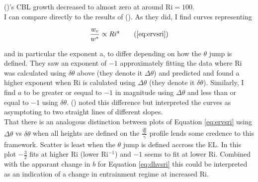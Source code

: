 \citeauthor{BrooksFowler2} (\citeyear{BrooksFowler2})'s \acs{CBL} growth decreased to almost zero at around \acs{Ri}$=100$.\\

I can compare directly to the results of \citeauthor{FedConzMir04} (\citeyear{FedConzMir04}). As they did, I find curves representing

\begin{equation}
\frac{w_{e}}{w^{*}} \propto Ri^{a} \tag{\ref{eq:ervsri}}
\end{equation}

and in particular the exponent a, to differ depending on how the $\theta$ jump is defined. They saw an exponent of $-1$ approximately fitting the data where \acs{Ri} was calculated using $\delta \theta$ above (they denote it $\Delta \theta$) and predicted and found a higher exponent when \acs{Ri} is calulated using $\Delta \theta$ (they denote it $\delta \theta$).  Similarly, I find $a$ to be greater or eequal to $-1$ in magnitude using $\Delta \theta$ and less than or equal to $-1$ using $\delta \theta$.  \citeauthor{GarciaMellado} (\citeyear{GarciaMellado}) noted this difference but interpreted the curves as asymptoting to two straight lines of different slopes.\\

That there is an analogous distinction between plots of Equation \ref{eq:ervsri} using $\Delta \theta$ vs $\delta \theta$ when all heights are defined on the $\frac{\frac{\partial \overline{\theta}}{\partial z}}{\gamma}$ profile lends some credence to this framework.  Scatter is least when the $\theta$ jump is defined accross the \acs{EL}.  In this plot $-\frac{3}{2}$ fits at higher \acs{Ri} (lower \acs{Ri}$^{-1}$) and $-1$ seems to fit at lower \acs{Ri}.  Combined with the apparant change in $b$ for Equation \ref{eq:dhvsri} this could be interpreted as an indication of a change in entrainment regime at increased \acs{Ri}.\\ 
 

